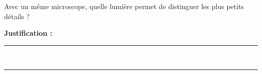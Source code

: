 Avec un même microscope, quelle lumière permet de distinguer les plus petits détails ?

\choices

\noindent\textbf{Justification :} \hrulefill \\[2.5ex]
\rule{\linewidth}{0.4pt} \\[2.5ex]
\rule{\linewidth}{0.4pt}
\vfill
